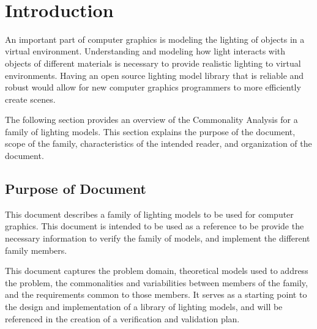 \documentclass[12pt]{article}
\begin{document}

\newpage

\tableofcontents

~\newpage


\section{Introduction}
An important part of computer graphics is modeling the lighting 
of objects in a virtual environment. Understanding and modeling how light 
interacts with objects of different materials is necessary to provide realistic 
lighting to virtual environments. Having an open source lighting model library 
that is reliable and robust would allow for new computer graphics programmers 
to more efficiently create scenes.

The following section provides an overview of the Commonality Analysis for a 
family of lighting models. This section explains the purpose of the document, 
scope of the family, characteristics of the intended reader, and organization 
of the document.

\subsection{Purpose of Document}
This document describes a family of lighting models to be used for computer 
graphics. This document is intended to be used as a reference to be provide the 
necessary information to verify the family of models, and implement the 
different family members. 

This document captures the problem domain, theoretical models used to address 
the problem, the commonalities and variabilities between members of the family, 
and the requirements common to those members. It serves as a starting point to 
the design and implementation of a library of lighting models, and will be 
referenced in the creation of a verification and validation plan.
\end{document}
